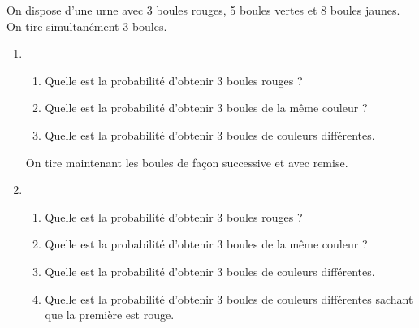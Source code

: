 




\begin{exercice}
On dispose d'une urne avec 3 boules rouges, 5 boules vertes et 8 boules jaunes. 
On tire simultanément 3 boules.
\begin{enumerate}

\item 
\begin{enumerate}
\item Quelle est la probabilité d'obtenir 3 boules rouges ?
\item Quelle est la probabilité d'obtenir 3 boules de la même couleur ?
\item Quelle est la probabilité d'obtenir 3 boules de couleurs différentes. \\
\end{enumerate}
On tire maintenant les boules de façon successive et avec remise. 
\item 
\begin{enumerate}
\item Quelle est la probabilité d'obtenir 3 boules rouges ?
\item Quelle est la probabilité d'obtenir 3 boules de la même couleur ?
\item Quelle est la probabilité d'obtenir 3 boules de couleurs différentes. 
\item Quelle est la probabilité d'obtenir 3 boules de couleurs différentes sachant que la première est rouge. 
\end{enumerate}
\end{enumerate} 

\end{exercice}



